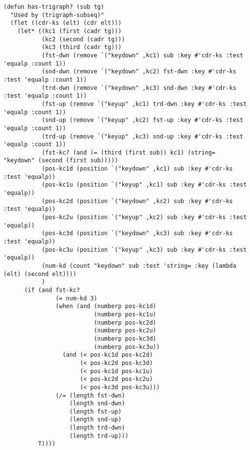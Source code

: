 \begin{lstlisting}[frame=single]
 (defun has-trigraph? (sub tg)
  "Used by (trigraph-subseq)"
  (flet ((cdr-ks (elt) (cdr elt)))
    (let* ((kc1 (first (cadr tg)))
           (kc2 (second (cadr tg)))
           (kc3 (third (cadr tg)))
           (fst-dwn (remove `("keydown" ,kc1) sub :key #'cdr-ks :test 'equalp :count 1))
           (snd-dwn (remove `("keydown" ,kc2) fst-dwn :key #'cdr-ks :test 'equalp :count 1))
           (trd-dwn (remove `("keydown" ,kc3) snd-dwn :key #'cdr-ks :test 'equalp :count 1))
           (fst-up (remove `("keyup" ,kc1) trd-dwn :key #'cdr-ks :test 'equalp :count 1))
           (snd-up (remove `("keyup" ,kc2) fst-up :key #'cdr-ks :test 'equalp :count 1))
           (trd-up (remove `("keyup" ,kc3) snd-up :key #'cdr-ks :test 'equalp :count 1))
           (fst-kc? (and (= (third (first sub)) kc1) (string= "keydown" (second (first sub)))))
           (pos-kc1d (position `("keydown" ,kc1) sub :key #'cdr-ks :test 'equalp))
           (pos-kc1u (position `("keyup" ,kc1) sub :key #'cdr-ks :test 'equalp))
           (pos-kc2d (position `("keydown" ,kc2) sub :key #'cdr-ks :test 'equalp))
           (pos-kc2u (position `("keyup" ,kc2) sub :key #'cdr-ks :test 'equalp))
           (pos-kc3d (position `("keydown" ,kc3) sub :key #'cdr-ks :test 'equalp))
           (pos-kc3u (position `("keyup" ,kc3) sub :key #'cdr-ks :test 'equalp))
           (num-kd (count "keydown" sub :test 'string= :key (lambda (elt) (second elt))))
           )
      (if (and fst-kc?
               (= num-kd 3)
               (when (and (numberp pos-kc1d)
                          (numberp pos-kc1u)
                          (numberp pos-kc2d)
                          (numberp pos-kc2u)
                          (numberp pos-kc3d)
                          (numberp pos-kc3u))
                 (and (< pos-kc1d pos-kc2d)
                      (< pos-kc2d pos-kc3d)
                      (< pos-kc1d pos-kc1u)
                      (< pos-kc2d pos-kc2u)
                      (< pos-kc3d pos-kc3u)))
               (/= (length fst-dwn)
                   (length snd-dwn)
                   (length fst-up)
                   (length snd-up)
                   (length trd-dwn)
                   (length trd-up)))
          T))))
\end{lstlisting}
